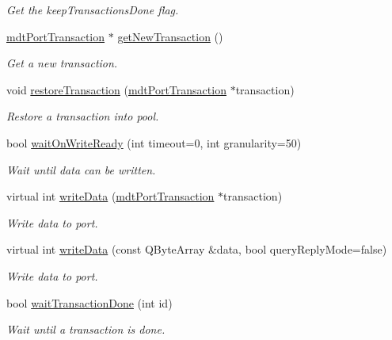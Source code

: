 \begin{DoxyCompactItemize}
\begin{DoxyCompactList}\small\item\em Get the keepTransactionsDone flag. \end{DoxyCompactList}\item 
\hyperlink{classmdt_port_transaction}{mdtPortTransaction} $\ast$ \hyperlink{classmdt_port_manager_a75ebd3d1859e3ed38b9558981e53aac4}{getNewTransaction} ()
\begin{DoxyCompactList}\small\item\em Get a new transaction. \end{DoxyCompactList}\item 
void \hyperlink{classmdt_port_manager_a5fea4a9b8e94d38e8ec699dba05c7ca8}{restoreTransaction} (\hyperlink{classmdt_port_transaction}{mdtPortTransaction} $\ast$transaction)
\begin{DoxyCompactList}\small\item\em Restore a transaction into pool. \end{DoxyCompactList}\item 
bool \hyperlink{classmdt_port_manager_a1ca92c5ac120d87e5b10bff54ed1aa5c}{waitOnWriteReady} (int timeout=0, int granularity=50)
\begin{DoxyCompactList}\small\item\em Wait until data can be written. \end{DoxyCompactList}\item 
virtual int \hyperlink{classmdt_port_manager_a328abc7f5f2677c19ea11567df6597da}{writeData} (\hyperlink{classmdt_port_transaction}{mdtPortTransaction} $\ast$transaction)
\begin{DoxyCompactList}\small\item\em Write data to port. \end{DoxyCompactList}\item 
virtual int \hyperlink{classmdt_port_manager_a9b902a60c8b21585904bcb1d6e604369}{writeData} (const QByteArray \&data, bool queryReplyMode=false)
\begin{DoxyCompactList}\small\item\em Write data to port. \end{DoxyCompactList}\item 
bool \hyperlink{classmdt_port_manager_a5551802de2c08632078f2cc0e2607913}{waitTransactionDone} (int id)
\begin{DoxyCompactList}\small\item\em Wait until a transaction is done. \end{DoxyCompactList}\item 

\end{DoxyCompactItemize}

